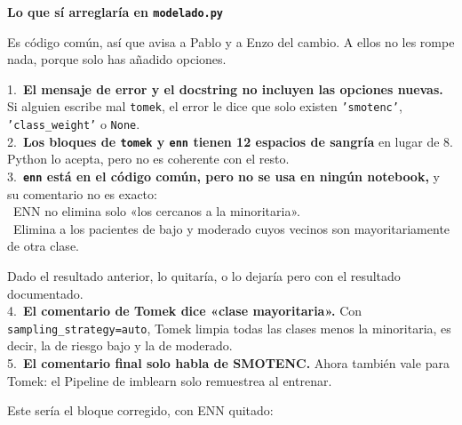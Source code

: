 \documentclass[11pt,a4paper]{article}
\begin{document}
{\smallskip\noindent\textbf{Lo que sí arreglaría en \texttt{modelado.py}}\par
Es código común, así que avisa a Pablo y a Enzo del cambio. A ellos no les rompe nada, porque solo has añadido opciones.

\hspace*{1.0em}1.~\textbf{El mensaje de error y el docstring no incluyen las opciones nuevas.} Si alguien escribe mal \texttt{\textquotedbl{}tomek\textquotedbl{}}, el error le dice que solo existen \texttt{'smotenc'}, \texttt{'class\_\allowbreak{}weight'} o \texttt{None}. \\{}
\hspace*{1.0em}2.~\textbf{Los bloques de \texttt{tomek} y \texttt{enn} tienen 12 espacios de sangría} en lugar de 8. Python lo acepta, pero no es coherente con el resto. \\{}
\hspace*{1.0em}3.~\textbf{\texttt{enn} está en el código común, pero no se usa en ningún notebook,} y su comentario no es exacto: \\{}
\hspace*{2.5em}\textbullet~ENN no elimina solo «los cercanos a la minoritaria». \\{}
\hspace*{2.5em}\textbullet~Elimina a los pacientes de bajo y moderado cuyos vecinos son mayoritariamente de otra clase.

   Dado el resultado anterior, lo quitaría, o lo dejaría pero con el resultado documentado. \\{}
\hspace*{1.0em}4.~\textbf{El comentario de Tomek dice «clase mayoritaria».} Con \texttt{sampling\_\allowbreak{}strategy=\textquotedbl{}auto\textquotedbl{}}, Tomek limpia todas las clases menos la minoritaria, es decir, la de riesgo bajo y la de moderado. \\{}
\hspace*{1.0em}5.~\textbf{El comentario final solo habla de SMOTENC.} Ahora también vale para Tomek: el Pipeline de imblearn solo remuestrea al entrenar.

Este sería el bloque corregido, con ENN quitado:

}
\end{document}

